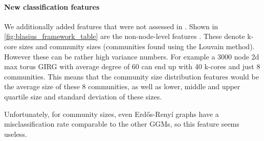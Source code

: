 \paragraph{New classification features}
We additionally added features that were not assessed in \cite{blasius2018towards}. Shown in \cref{fig:blasius_framework_table} are the non-node-level features . These denote k-core sizes and community sizes (communities found using the Louvain method).
However these can be rather high variance numbers. For example a 3000 node 2d max torus GIRG with average degree of 60 can end up with 40 k-cores and just 8 communities. This means that the community size distribution features would be the average size of these 8 communities, as well as lower, middle and upper quartile size and standard deviation of these sizes.

Unfortunately, for community sizes, even Erd\H{o}s-Reny{\'i} graphs have a misclassification rate comparable to the other GGMs, so this feature seems useless.



